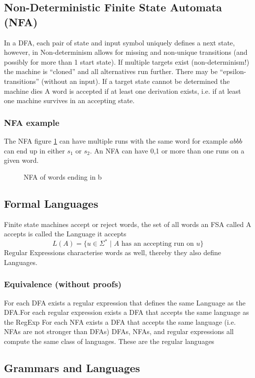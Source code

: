 \subsection{Non-Deterministic Finite State Automata (NFA)}
In a DFA, each pair of state and input symbol uniquely defines a next state, however, in Non-determinism allows for missing and non-unique transitions (and possibly for more than 1 start state). If multiple targets exist (non-determinism!) the machine is “cloned” and all alternatives run further. There may be “epsilon-transitions” (without an input). If a target state cannot be determined the machine dies
A word is accepted if at least one derivation exists, i.e. if at least
one machine survives in an accepting state.
\subsubsection{NFA example}
The NFA figure \ref{fig:NFA*} can have multiple runs with the same word for example $abbb$ can end up in either $s_1$ or $s_2$. An NFA can have 0,1 or more than one runs on a given word.
\begin{figure}[H]
    \centering
    \caption{NFA of words ending in b}
    \label{fig:NFA*}
\end{figure}
\subsection{Formal Languages}
Finite state machines accept or reject words, the set of all words an FSA called A accepts is called the Language it accepts 
\begin{equation}
    L(A) = \{u \in \Sigma^* \,\,|\,\, A \text{ has an accepting run on }u\}
\end{equation}
Regular Expressions characterise words as well, thereby they also define Languages.
\subsubsection{Equivalence (without proofs)}
For each DFA exists a regular expression that defines the same Language as the DFA.For each regular expression exists a DFA that accepts the same language as the RegExp For each NFA exists a DFA that accepts the same language (i.e. NFAs are not stronger than DFAs) DFAs, NFAs, and regular expressions all compute the same class of languages. These are the regular languages
\subsection{Grammars and Languages}

